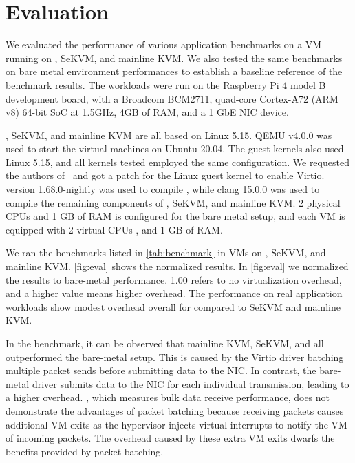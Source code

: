 \chapter{Evaluation}
\label{sec:eval}

We evaluated the performance of various application benchmarks
on a VM running on \rustsec{}, SeKVM, and mainline KVM.
We also tested the same
benchmarks on bare metal environment performances to establish a baseline
reference of the benchmark results. The workloads were run on the Raspberry
Pi 4 model B development board, with a Broadcom BCM2711, quad-core
Cortex-A72 (ARM v8) 64-bit SoC at 1.5GHz, 4GB of RAM, and a 1 GbE NIC device.

\rustsec{}, SeKVM, and mainline KVM are all based on Linux 5.15.
QEMU v4.0.0 was used to start the virtual machines on Ubuntu 20.04. The guest
kernels also used Linux 5.15, and all kernels tested employed the same 
configuration. We requested the authors of~\cite{hypsec} and got a patch for
the Linux guest kernel to enable Virtio.
 version 1.68.0-nightly was used to compile \rustcore{},
while clang 15.0.0 was used to compile the remaining components of
\rustsec{}, SeKVM, and mainline KVM.
2 physical CPUs and 1 GB of RAM is configured for the bare
metal setup, and each VM is equipped with 2 virtual CPUs , and 1 GB of RAM.

We ran the benchmarks listed in \autoref{tab:benchmark} in VMs on
\rustsec{}, SeKVM, and mainline KVM. \autoref{fig:eval} shows the normalized
results. In \autoref{fig:eval} we normalized the results to bare-metal
performance. 1.00 refers to no virtualization overhead, and
a higher value means higher overhead. The performance on real application
workloads show modest overhead overall for \rustsec{} compared to SeKVM and
mainline KVM.

In the  benchmark, it can be observed that mainline KVM,
SeKVM, and \rustsec{} all outperformed the bare-metal setup. This is caused by
the Virtio driver batching multiple packet sends before submitting data to the
NIC. In contrast, the bare-metal driver submits data to the NIC for each
individual transmission, leading to a higher overhead.
, which measures bulk data receive performance, does not
demonstrate the advantages of packet batching because receiving packets causes
additional VM exits as the hypervisor injects virtual interrupts to notify the
VM of incoming packets. The overhead caused by these extra VM exits dwarfs the
benefits provided by packet batching.

